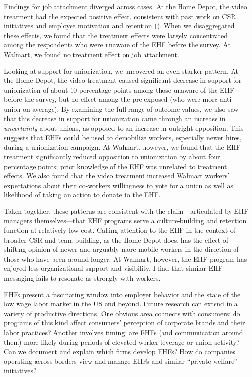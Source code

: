 \documentclass[
  11pt,
  oneside]{article}
\begin{document}
Findings for job attachment diverged across cases. At the Home Depot, the video treatment had the expected positive effect, consistent with past work on CSR initiatives and employee motivation and retention (). When we disaggregated these effects, we found that the treatment effects were largely concentrated among the respondents who were unaware of the EHF before the survey. At Walmart, we found no treatment effect on job attachment.

Looking at support for unionization, we uncovered an even starker pattern. At the Home Depot, the video treatment caused significant decrease in support for unionization of about 10 percentage points among those unaware of the EHF before the survey, but no effect among the pre-exposed (who were more anti-union on average). By examining the full range of outcome values, we also saw that this decrease in support for unionization came through an increase in \emph{uncertainty} about unions, as opposed to an increase in outright opposition. This suggests that EHFs could be used to demobilize workers, especially newer hires, during a unionization campaign. At Walmart, however, we found that the EHF treatment significantly reduced opposition to unionization by about four percentage points; prior knowledge of the EHF was unrelated to treatment effects. We also found that the video treatment increased Walmart workers' expectations about their co-workers willingness to vote for a union as well as likelihood of taking an action to donate to the EHF.

Taken together, these patterns are consistent with the claim---articulated by EHF managers themselves---that EHF programs serve a culture-building and retention function at relatively low cost. Calling attention to the EHF in the context of broader CSR and team building, as the Home Depot does, has the effect of shifting opinion of newer and arguably more mobile workers in the direction of those who have been around longer. At Walmart, however, the EHF program has enjoyed less organizational support and visibility. I find that similar EHF messaging fails to resonate as strongly with workers.

EHFs present a fascinating window into employer behavior and the state of the low wage labor market in the US and beyond. Future research can extend in a variety of productive directions. One obvious area connects with consumers: do programs of this kind affect consumers' perception of corporate brands and their labor practices? Another involves timing: are EHFs (and communication around them) more likely during periods of elevated worker leverage or union activity? Can we document and explain which firms develop EHFs? How do companies operating across borders view and manage EHFs and similar ``private welfare'' initiatives?
\end{document}
